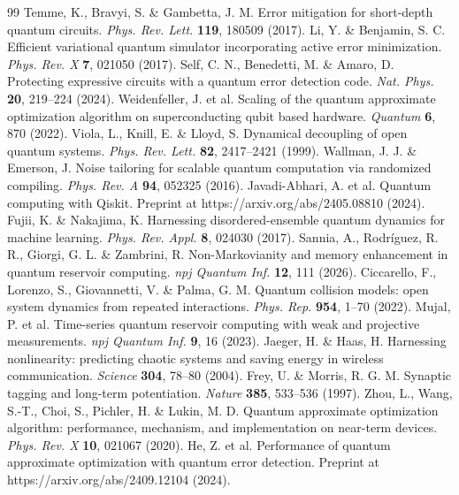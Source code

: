 \documentclass[12pt,a4paper]{article}
\begin{document}
\begin{thebibliography}{99}
 Temme, K., Bravyi, S. \& Gambetta, J. M. Error mitigation for short-depth quantum circuits. \textit{Phys. Rev. Lett.} \textbf{119}, 180509 (2017).
 Li, Y. \& Benjamin, S. C. Efficient variational quantum simulator incorporating active error minimization. \textit{Phys. Rev. X} \textbf{7}, 021050 (2017).
 Self, C. N., Benedetti, M. \& Amaro, D. Protecting expressive circuits with a quantum error detection code. \textit{Nat. Phys.} \textbf{20}, 219--224 (2024).
 Weidenfeller, J. et al. Scaling of the quantum approximate optimization algorithm on superconducting qubit based hardware. \textit{Quantum} \textbf{6}, 870 (2022).
 Viola, L., Knill, E. \& Lloyd, S. Dynamical decoupling of open quantum systems. \textit{Phys. Rev. Lett.} \textbf{82}, 2417--2421 (1999).
 Wallman, J. J. \& Emerson, J. Noise tailoring for scalable quantum computation via randomized compiling. \textit{Phys. Rev. A} \textbf{94}, 052325 (2016).
 Javadi-Abhari, A. et al. Quantum computing with Qiskit. Preprint at https://arxiv.org/abs/2405.08810 (2024).
 Fujii, K. \& Nakajima, K. Harnessing disordered-ensemble quantum dynamics for machine learning. \textit{Phys. Rev. Appl.} \textbf{8}, 024030 (2017).
 Sannia, A., Rodr\'iguez, R. R., Giorgi, G. L. \& Zambrini, R. Non-Markovianity and memory enhancement in quantum reservoir computing. \textit{npj Quantum Inf.} \textbf{12}, 111 (2026).
 Ciccarello, F., Lorenzo, S., Giovannetti, V. \& Palma, G. M. Quantum collision models: open system dynamics from repeated interactions. \textit{Phys. Rep.} \textbf{954}, 1--70 (2022).
 Mujal, P. et al. Time-series quantum reservoir computing with weak and projective measurements. \textit{npj Quantum Inf.} \textbf{9}, 16 (2023).
 Jaeger, H. \& Haas, H. Harnessing nonlinearity: predicting chaotic systems and saving energy in wireless communication. \textit{Science} \textbf{304}, 78--80 (2004).
 Frey, U. \& Morris, R. G. M. Synaptic tagging and long-term potentiation. \textit{Nature} \textbf{385}, 533--536 (1997).
 Zhou, L., Wang, S.-T., Choi, S., Pichler, H. \& Lukin, M. D. Quantum approximate optimization algorithm: performance, mechanism, and implementation on near-term devices. \textit{Phys. Rev. X} \textbf{10}, 021067 (2020).
 He, Z. et al. Performance of quantum approximate optimization with quantum error detection. Preprint at https://arxiv.org/abs/2409.12104 (2024).
\end{thebibliography}
\end{document}
